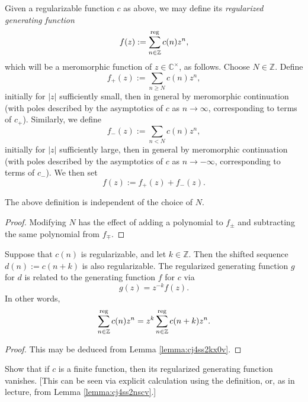 \documentclass[reqno]{amsart}  \numberwithin{theorem}{section} \numberwithin{equation}{section}
\begin{document}
\begin{definition}\label{definition:cj4ss5ec2g}
  Given a regularizable function $c$ as above, we may define its \emph{regularized generating function}
  \begin{equation}\label{eq:cj4ss5ffxd}
    f(z) := \sum_{n \in \mathbb{Z} }^{\operatorname{reg}} c(n) z^n,
  \end{equation}
  which will be a meromorphic function of $z \in \mathbb{C}^\times$, as follows.  Choose $N \in \mathbb{Z}$.  Define
  \begin{equation*}
    f_+(z) := \sum_{n \geq N} c(n) z^n,
  \end{equation*}
  initially for $\lvert z \rvert$ sufficiently small, then in general by meromorphic continuation (with poles described by the asymptotics of $c$ as $n \rightarrow \infty$, corresponding to terms of $c_+$).  Similarly, we define
  \begin{equation*}
    f_-(z) := \sum_{n < N} c(n) z^n,
  \end{equation*}
  initially for $\lvert z \rvert$ sufficiently large, then in general by meromorphic continuation (with poles described by the asymptotics of $c$ as $n \rightarrow -\infty$, corresponding to terms of $c_-$).  We then set
  \begin{equation*}
    f(z) := f_+(z) + f_-(z).
  \end{equation*}
\end{definition}
\begin{lemma}\label{lemma:cj4ss2kx0v}
  The above definition is independent of the choice of $N$.
\end{lemma}
\begin{proof}
  Modifying $N$ has the effect of adding a polynomial to $f_{\pm}$ and subtracting the same polynomial from $f_{\mp}$.
\end{proof}
\begin{lemma}\label{lemma:cj4ss2nscv}
  Suppose that $c(n)$ is regularizable, and let $k \in \mathbb{Z}$.  Then the shifted sequence $d(n) := c(n+k)$ is also regularizable.  The regularized generating function $g$ for $d$ is related to the generating function $f$ for $c$ via
  \begin{equation*}
    g(z) = z^{-k} f(z).
  \end{equation*}
  In other words,
  \begin{equation*}
    \sum_{n \in \mathbb{Z}}^{\operatorname{reg}} c(n) z^n
    = 
    z^k \sum_{n \in \mathbb{Z}}^{\operatorname{reg}} c(n+k) z^n.
  \end{equation*}
\end{lemma}
\begin{proof}
  This may be deduced from Lemma \ref{lemma:cj4ss2kx0v}.
\end{proof}
\begin{exercise}\label{exercise:cj4ss5ia8l}
  Show that if $c$ is a finite function, then its regularized generating function vanishes.  [This can be seen via explicit calculation using the definition, or, as in lecture, from Lemma \ref{lemma:cj4ss2nscv}.]
\end{exercise}
\end{document}
